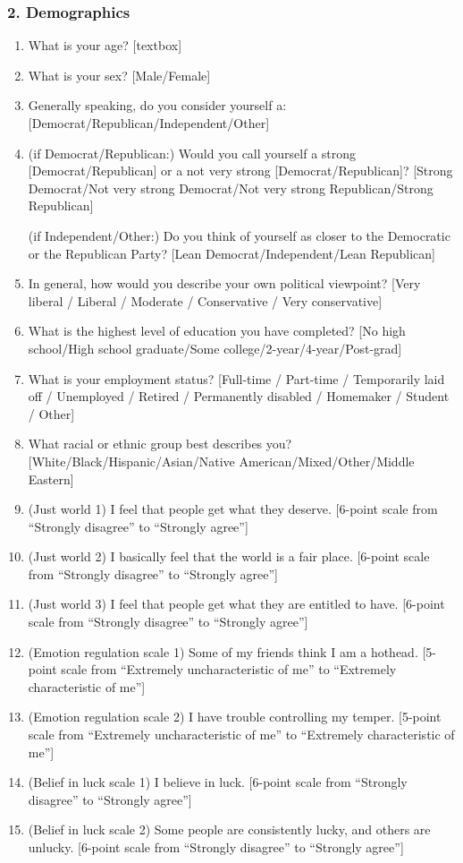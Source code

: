 \subsubsection*{2. Demographics}
\begin{enumerate}
    \item What is your age? [textbox]
    \item What is your sex? [Male/Female]
    \item Generally speaking, do you consider yourself a: [Democrat/Republican/Independent/Other]
    \item (if Democrat/Republican:) Would you call yourself a strong [Democrat/Republican] or
    a not very strong [Democrat/Republican]? [Strong Democrat/Not very strong
    Democrat/Not very strong Republican/Strong Republican]

    (if Independent/Other:) Do you think of yourself as closer to the
    Democratic or the Republican Party? [Lean Democrat/Independent/Lean
    Republican]
    \item In general, how would you describe your own political viewpoint?
    [Very liberal / Liberal / Moderate / Conservative / Very conservative]
    \item What is the highest level of education you have completed? [No high
    school/High school graduate/Some college/2-year/4-year/Post-grad] 
    \item What
    is your employment status? [Full-time / Part-time / Temporarily laid off /
    Unemployed / Retired / Permanently disabled / Homemaker / Student / Other]
    \item What racial or ethnic group best describes you?
    [White/Black/Hispanic/Asian/Native American/Mixed/Other/Middle Eastern]
    \item (Just world 1) I feel that people get what they deserve. [6-point
    scale from ``Strongly disagree'' to ``Strongly agree''] 
    \item (Just world 2) I
    basically feel that the world is a fair place. [6-point scale from ``Strongly
    disagree'' to ``Strongly agree''] 
    \item (Just world 3) I feel that people get what
    they are entitled to have. [6-point scale from ``Strongly disagree'' to ``Strongly
    agree''] 
    \item (Emotion regulation scale 1) Some of my friends think I am a
    hothead. [5-point scale from ``Extremely uncharacteristic of me'' to
    ``Extremely characteristic of me''] 
    \item (Emotion regulation scale 2) I have
    trouble controlling my temper. [5-point scale from ``Extremely
    uncharacteristic of me'' to ``Extremely characteristic of me''] 
    \item (Belief
    in luck scale 1) I believe in luck. [6-point scale from ``Strongly disagree'' to
    ``Strongly agree''] 
    \item (Belief in luck scale 2) Some people are consistently
    lucky, and others are unlucky. [6-point scale from ``Strongly disagree'' to
    ``Strongly agree'']
\end{enumerate}


